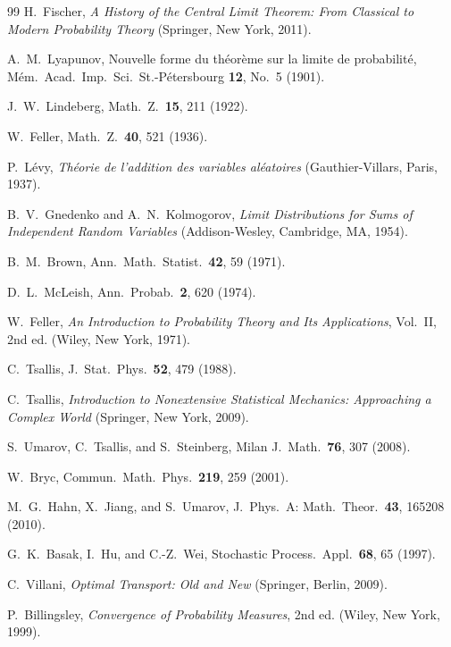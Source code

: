 \documentclass[aip,jmp,preprint,onecolumn,floatfix,superscriptaddress,nofootinbib,11pt]{revtex4-2}
\theoremstyle{plain}
\theoremstyle{remark}
\numberwithin{equation}{section}
\begin{document}
\clearpage
\begin{thebibliography}{99}
 H.~Fischer, \emph{A History of the Central Limit Theorem: From Classical to Modern Probability Theory} (Springer, New York, 2011).

 A.~M.~Lyapunov, Nouvelle forme du th\'eor\`eme sur la limite de probabilit\'e, M\'em.\ Acad.\ Imp.\ Sci.\ St.-P\'etersbourg \textbf{12}, No.~5 (1901).

 J.~W.~Lindeberg, Math.\ Z.\ \textbf{15}, 211 (1922).

 W.~Feller, Math.\ Z.\ \textbf{40}, 521 (1936).

 P.~L\'evy, \emph{Th\'eorie de l'addition des variables al\'eatoires} (Gauthier-Villars, Paris, 1937).

 B.~V.~Gnedenko and A.~N.~Kolmogorov, \emph{Limit Distributions for Sums of Independent Random Variables} (Addison-Wesley, Cambridge, MA, 1954).

 B.~M.~Brown, Ann.\ Math.\ Statist.\ \textbf{42}, 59 (1971).

 D.~L.~McLeish, Ann.\ Probab.\ \textbf{2}, 620 (1974).

 W.~Feller, \emph{An Introduction to Probability Theory and Its Applications}, Vol.~II, 2nd ed. (Wiley, New York, 1971).

 C.~Tsallis, J.\ Stat.\ Phys.\ \textbf{52}, 479 (1988).

 C.~Tsallis, \emph{Introduction to Nonextensive Statistical Mechanics: Approaching a Complex World} (Springer, New York, 2009).

 S.~Umarov, C.~Tsallis, and S.~Steinberg, Milan J.\ Math.\ \textbf{76}, 307 (2008).

 W.~Bryc, Commun.\ Math.\ Phys.\ \textbf{219}, 259 (2001).

 M.~G.~Hahn, X.~Jiang, and S.~Umarov, J.\ Phys.\ A: Math.\ Theor.\ \textbf{43}, 165208 (2010).

 G.~K.~Basak, I.~Hu, and C.-Z.~Wei, Stochastic Process.\ Appl.\ \textbf{68}, 65 (1997).

 C.~Villani, \emph{Optimal Transport: Old and New} (Springer, Berlin, 2009).

 P.~Billingsley, \emph{Convergence of Probability Measures}, 2nd ed. (Wiley, New York, 1999).

\end{thebibliography}
\end{document}
